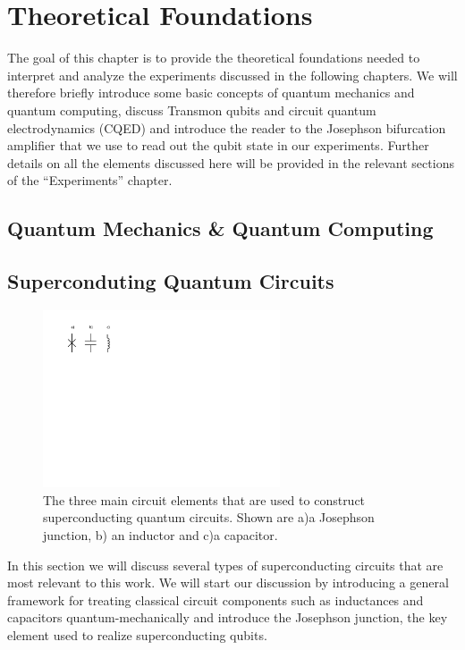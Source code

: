\chapter{Theoretical Foundations}

The goal of this chapter is to provide the theoretical foundations needed to interpret and analyze the experiments discussed in the following chapters. We will therefore briefly introduce some basic concepts of quantum mechanics and quantum computing, discuss Transmon qubits and circuit quantum electrodynamics (CQED) and introduce the reader to the Josephson bifurcation amplifier that we use to read out the qubit state in our experiments. Further details on all the elements discussed here will be provided in the relevant sections of the ``Experiments'' chapter.

\section{Quantum Mechanics \& Quantum Computing}

\section{Superconduting Quantum Circuits}

\begin{figure}
	\includegraphics[width=7cm]{"./material/figures/introduction/circuit_elements"}
	\caption{The three main circuit elements that are used to construct superconducting quantum circuits. Shown are a)a Josephson junction, b) an inductor and c)a capacitor.}
	\label{fig:SuperconductingCircuitElements}
\end{figure}

In this section we will discuss several types of superconducting circuits that are most relevant to this work. We will start our discussion by introducing a general framework for treating classical circuit components such as inductances and capacitors quantum-mechanically and introduce the Josephson junction, the key element used to realize superconducting qubits.

